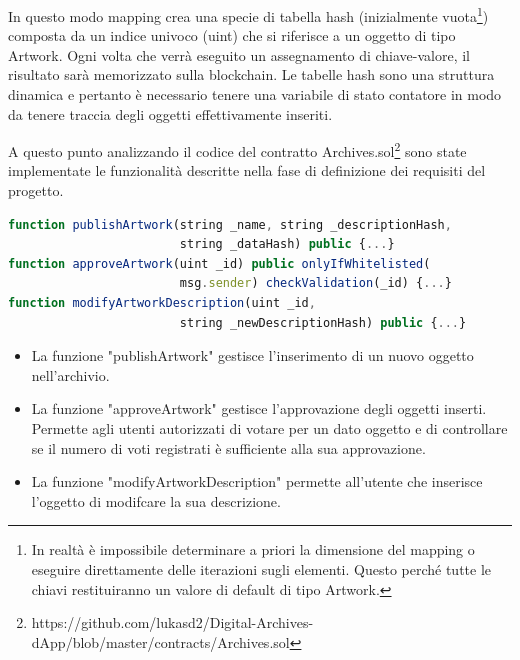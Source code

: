 In questo modo mapping crea una specie di tabella hash (inizialmente vuota\footnote{In realtà è impossibile determinare a priori la dimensione del mapping o eseguire direttamente delle iterazioni sugli elementi. Questo perché tutte le chiavi restituiranno un valore di default di tipo Artwork.}) composta da un indice univoco (uint) che si riferisce a un oggetto di tipo Artwork. Ogni volta che verrà eseguito un assegnamento di chiave-valore, il risultato sarà memorizzato sulla blockchain. Le tabelle hash sono una struttura dinamica e pertanto è necessario tenere una variabile di stato contatore in modo da tenere traccia degli oggetti effettivamente inseriti.

A questo punto analizzando il codice del contratto Archives.sol\footnote{https://github.com/lukasd2/Digital-Archives-dApp/blob/master/contracts/Archives.sol} sono state implementate le funzionalità descritte nella fase di definizione dei requisiti del progetto.
\\
\begin{lstlisting}[caption={Funzioni principali del contratto Archives.sol},language=JavaScript]
function publishArtwork(string _name, string _descriptionHash, 
                        string _dataHash) public {...}
function approveArtwork(uint _id) public onlyIfWhitelisted(
                        msg.sender) checkValidation(_id) {...}
function modifyArtworkDescription(uint _id, 
                        string _newDescriptionHash) public {...}
\end{lstlisting}

\begin{itemize}
\item La funzione "publishArtwork" gestisce l'inserimento di un nuovo oggetto nell'archivio.
\item La funzione "approveArtwork" gestisce l'approvazione degli oggetti inserti. Permette agli utenti autorizzati di votare per un dato oggetto e di controllare se il numero di voti registrati è sufficiente alla sua approvazione.
\item La funzione "modifyArtworkDescription" permette all'utente che inserisce l'oggetto di modifcare la sua descrizione.
\end{itemize}

